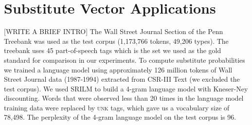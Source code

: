 \section{Substitute Vector Applications}
[WRITE A BRIEF INTRO]
The Wall Street Journal Section of the Penn Treebank \cite{treebank3}
was used as the test corpus (1,173,766 tokens, 49,206 types).
The treebank uses 45 part-of-speech tags which is the set we used as
the gold standard for comparison in our experiments.
To compute substitute probabilities we trained a language model using
approximately 126 million tokens of Wall Street Journal data
(1987-1994) extracted from CSR-III Text \cite{csr3text} (we excluded
the test corpus).
We used SRILM \cite{Stolcke2002} to build a 4-gram language model with
Kneser-Ney discounting.
Words that were observed less than 20 times in the language model
training data were replaced by \textsc{unk} tags, which gave us a
vocabulary size of 78,498.
The perplexity of the 4-gram language model on the test corpus is 96.


